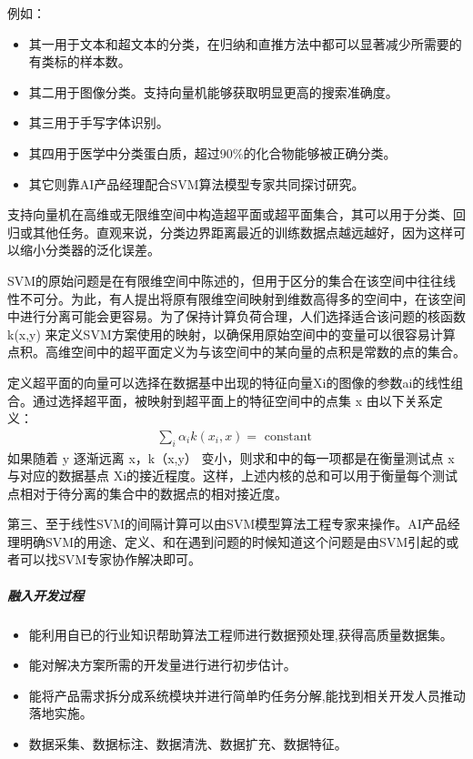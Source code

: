 \documentclass[letterpaper,10pt,english]{sphinxmanual}
\begin{document}
例如：
\begin{itemize}
\item {} 
其一用于文本和超文本的分类，在归纳和直推方法中都可以显著减少所需要的有类标的样本数。

\item {} 
其二用于图像分类。支持向量机能够获取明显更高的搜索准确度。

\item {} 
其三用于手写字体识别。

\item {} 
其四用于医学中分类蛋白质，超过90\%的化合物能够被正确分类。

\item {} 
其它则靠AI产品经理配合SVM算法模型专家共同探讨研究。

\end{itemize}


支持向量机在高维或无限维空间中构造超平面或超平面集合，其可以用于分类、回归或其他任务。直观来说，分类边界距离最近的训练数据点越远越好，因为这样可以缩小分类器的泛化误差。

SVM的原始问题是在有限维空间中陈述的，但用于区分的集合在该空间中往往线性不可分。为此，有人提出将原有限维空间映射到维数高得多的空间中，在该空间中进行分离可能会更容易。为了保持计算负荷合理，人们选择适合该问题的核函数
k(x,y)
来定义SVM方案使用的映射，以确保用原始空间中的变量可以很容易计算点积。高维空间中的超平面定义为与该空间中的某向量的点积是常数的点的集合。

定义超平面的向量可以选择在数据基中出现的特征向量Xi的图像的参数ai的线性组合。通过选择超平面，被映射到超平面上的特征空间中的点集
x 由以下关系定义：
\begin{equation}\label{equation:chapter_idea/understand_tech:chapter_idea/understand_tech:0}
\begin{split}\sum_{i} \alpha_{i} k\left(x_{i}, x\right)=\text { constant }\end{split}
\end{equation}
如果随着 y 逐渐远离 x，k（x,y） 变小，则求和中的每一项都是在衡量测试点 x
与对应的数据基点
Xi的接近程度。这样，上述内核的总和可以用于衡量每个测试点相对于待分离的集合中的数据点的相对接近度。

第三、至于线性SVM的间隔计算可以由SVM模型算法工程专家来操作。AI产品经理明确SVM的用途、定义、和在遇到问题的时候知道这个问题是由SVM引起的或者可以找SVM专家协作解决即可。


\subparagraph{融入开发过程}
\label{\detokenize{chapter_idea/understand_tech:id6}}\begin{itemize}
\item {} 
能利用自已的行业知识帮助算法工程师进行数据预处理,获得高质量数据集。

\item {} 
能对解决方案所需的开发量进行进行初步估计。

\item {} 
能将产品需求拆分成系统模块并进行简单旳任务分解,能找到相关开发人员推动落地实施。

\item {} 
数据采集、数据标注、数据清洗、数据扩充、数据特征。

\end{itemize}
\end{document}
